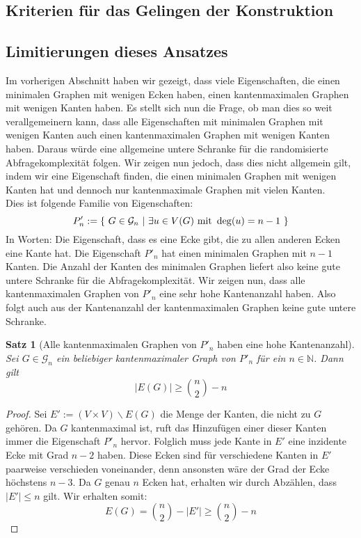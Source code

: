 \documentclass[a4paper]{scrreprt}
\newtheorem{Satz}[definition]{Satz}
\theoremstyle{definition}
\begin{document}
\subsection{Kriterien für das Gelingen der Konstruktion}

\subsection{Limitierungen dieses Ansatzes}
Im vorherigen Abschnitt haben wir gezeigt, dass viele Eigenschaften,
die einen  minimalen Graphen mit wenigen Ecken haben, einen kantenmaximalen
Graphen mit wenigen Kanten haben. Es stellt sich nun die Frage,
ob man dies so weit verallgemeinern kann, dass alle Eigenschaften
mit minimalen Graphen mit wenigen Kanten auch einen kantenmaximalen
Graphen mit wenigen Kanten haben. Daraus würde eine allgemeine
untere Schranke für die randomisierte Abfragekomplexität folgen.
Wir zeigen nun jedoch, dass dies nicht allgemein gilt, indem wir
eine Eigenschaft finden, die einen minimalen Graphen mit wenigen
Kanten hat und dennoch nur kantenmaximale Graphen mit vielen Kanten. \\
Dies ist folgende Familie von Eigenschaften:
$$ P'_n := \{ \ G \in \mathcal{G}_n \ 
| \ \exists u\in V(G) \textup{ mit } \deg(u) = n-1 \ \}$$
In Worten: Die Eigenschaft, dass es eine Ecke gibt,
die zu allen anderen Ecken eine Kante hat.
Die Eigenschaft $P'_n$ hat einen minimalen Graphen mit
$n-1$ Kanten. Die Anzahl der Kanten des minimalen Graphen
liefert also keine gute untere Schranke für die Abfragekomplexität.
Wir zeigen nun, dass alle kantenmaximalen Graphen von $P'_n$
eine sehr hohe Kantenanzahl haben. Also folgt auch aus der Kantenanzahl
der kantenmaximalen Graphen keine gute untere Schranke.
\begin{Satz}[Alle kantenmaximalen Graphen von $P'_n$ 
             haben eine hohe Kantenanzahl]
Sei $G\in \mathcal{G}_n$ ein beliebiger kantenmaximaler Graph
von $P'_n$ für ein $n\in \mathbb{N}$. Dann gilt
$$ |E(G)| \geq \binom{n}{2} - n $$
\end{Satz}
\begin{proof}
Sei $E' := (V \times V) \backslash E(G)$ die Menge der Kanten, die nicht
zu $G$ gehören. Da $G$ kantenmaximal ist, ruft das Hinzufügen
einer dieser Kanten immer die Eigenschaft $P'_n$ hervor.
Folglich muss jede Kante in $E'$ eine inzidente Ecke mit Grad
$n-2$ haben. Diese Ecken sind für verschiedene Kanten in $E'$
paarweise verschieden voneinander, denn ansonsten wäre der
Grad der Ecke höchstens $n-3$. Da $G$ genau $n$ Ecken hat,
erhalten wir durch Abzählen, dass $|E'| \leq n$ gilt.
Wir erhalten somit:
$$ E(G) = \binom{n}{2} - |E'| \geq \binom{n}{2} - n $$
\end{proof}
\end{document}
